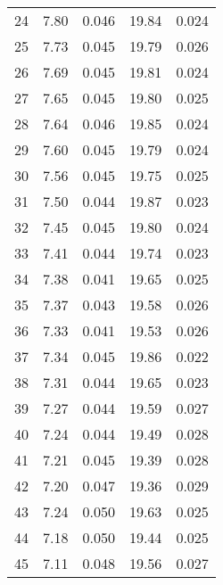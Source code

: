 \begin{table}
\begin{tabular}{c|ll|ll}
24 & 7.80 & 0.046 & 19.84 & 0.024 \\
25 & 7.73 & 0.045 & 19.79 & 0.026 \\
26 & 7.69 & 0.045 & 19.81 & 0.024 \\
27 & 7.65 & 0.045 & 19.80 & 0.025 \\
28 & 7.64 & 0.046 & 19.85 & 0.024 \\
29 & 7.60 & 0.045 & 19.79 & 0.024 \\
30 & 7.56 & 0.045 & 19.75 & 0.025 \\
31 & 7.50 & 0.044 & 19.87 & 0.023 \\
32 & 7.45 & 0.045 & 19.80 & 0.024 \\
33 & 7.41 & 0.044 & 19.74 & 0.023 \\
34 & 7.38 & 0.041 & 19.65 & 0.025 \\
35 & 7.37 & 0.043 & 19.58 & 0.026 \\
36 & 7.33 & 0.041 & 19.53 & 0.026 \\
37 & 7.34 & 0.045 & 19.86 & 0.022 \\
38 & 7.31 & 0.044 & 19.65 & 0.023 \\
39 & 7.27 & 0.044 & 19.59 & 0.027 \\
40 & 7.24 & 0.044 & 19.49 & 0.028 \\
41 & 7.21 & 0.045 & 19.39 & 0.028 \\
42 & 7.20 & 0.047 & 19.36 & 0.029 \\
43 & 7.24 & 0.050 & 19.63 & 0.025 \\
44 & 7.18 & 0.050 & 19.44 & 0.025 \\
45 & 7.11 & 0.048 & 19.56 & 0.027 \\
               \hline
        \end{tabular}
    \end{table}
    \clearpage


